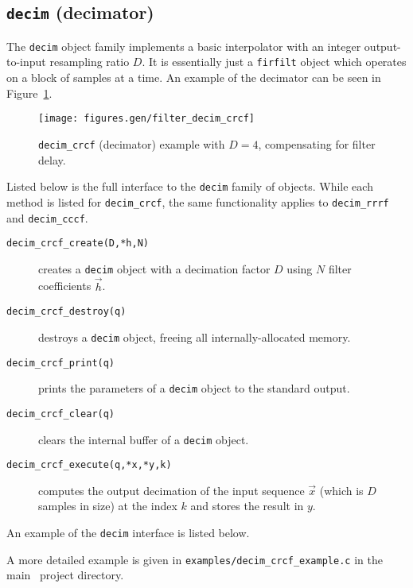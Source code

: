 \subsection{{\tt decim} (decimator)}
\label{module:filter:decim}
The {\tt decim} object family implements a basic interpolator with an
integer output-to-input resampling ratio $D$.
It is essentially just a {\tt firfilt} object which operates on a block
of samples at a time.
An example of the decimator can be seen in
Figure~\ref{fig:module:filter:decim_crcf}.
%
\begin{figure}
\centering
  \texttt{[image: figures.gen/filter\_decim\_crcf]}
\caption{{\tt decim\_crcf} (decimator) example with $D=4$,
         compensating for filter delay.}
\label{fig:module:filter:decim_crcf}
\end{figure}
%
Listed below is the full interface to the {\tt decim} family of
objects.
While each method is listed for {\tt decim\_crcf}, the same
functionality applies to {\tt decim\_rrrf} and {\tt decim\_cccf}.
%
\begin{description}
\item[{\tt decim\_crcf\_create(D,*h,N)}]
    creates a {\tt decim} object with a decimation factor $D$ using $N$
    filter coefficients $\vec{h}$.
\item[{\tt decim\_crcf\_destroy(q)}]
    destroys a {\tt decim} object, freeing all internally-allocated
    memory.
\item[{\tt decim\_crcf\_print(q)}]
    prints the parameters of a {\tt decim} object to the standard
    output.
\item[{\tt decim\_crcf\_clear(q)}]
    clears the internal buffer of a {\tt decim} object.
\item[{\tt decim\_crcf\_execute(q,*x,*y,k)}]
    computes the output decimation of the input sequence $\vec{x}$
    (which is $D$ samples in size) at the index $k$ and stores the
    result in $y$.
\end{description}
%
An example of the {\tt decim} interface is listed below.
%

%
A more detailed example is given in
{\tt examples/decim\_crcf\_example.c}
in the main \liquid\ project directory.


% 
%
